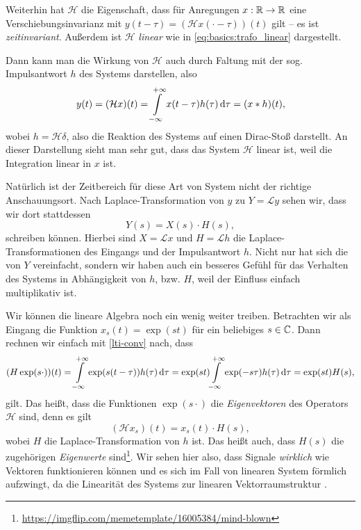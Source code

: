 Weiterhin hat $\mathcal{H}$ die Eigenschaft, dass 
für Anregungen $x : \mathbb{R} \rightarrow \mathbb{R}$ eine Verschiebungsinvarianz mit $y(t - \tau) = (\mathcal{H}x(\cdot  - \tau))(t)$ gilt -- es ist \emph{zeitinvariant}.
Außerdem ist $\mathcal{H}$ \emph{linear} wie in \eqref{eq:basics:trafo_linear} dargestellt.

Dann kann man die Wirkung von $\mathcal{H}$ auch durch Faltung mit der sog. Impulsantwort $h$ des Systems darstellen, also
%
\begin{equation}\label{lti-conv}
    y(t) 
        = (\mathcal{H}x)(t) 
        = {\int\limits_{-\infty}^{+\infty}{x(t - \tau) h(\tau)}\,\mathrm{d}{\tau}} 
        = (x \ast h)(t),
\end{equation}
%
wobei $h = \mathcal{H}\delta$, also die Reaktion des Systems auf einen Dirac-Stoß darstellt.
An dieser Darstellung sieht man sehr gut, dass das System $\mathcal{H}$ linear ist, weil die Integration linear in $x$ ist.

Natürlich ist der Zeitbereich für diese Art von System nicht der richtige Anschauungsort. 
Nach Laplace-Transformation von $y$ zu $Y = \mathcal{L}y$ sehen wir, dass wir dort stattdessen 
\[
Y(s) = X(s) \cdot H(s),
\]
schreiben können. 
Hierbei sind $X = \mathcal{L}x$ und $H = \mathcal{L}h$ die Laplace-Transformationen des Eingangs und der Impulsantwort $h$.
Nicht nur hat sich die  von $Y$ vereinfacht, sondern wir haben auch ein besseres Gefühl für das Verhalten des Systems in Abhängigkeit von $h$, bzw. $H$, weil der Einfluss einfach multiplikativ ist.

Wir können die lineare Algebra noch ein wenig weiter treiben. Betrachten wir als Eingang die Funktion $x_s(t) = \exp(s t)$ für ein beliebiges $s \in \mathbb{C}$.
Dann rechnen wir einfach mit \eqref{lti-conv} nach, dass
\[
(H\exp(s\cdot))(t) 
    = {\int\limits_{-\infty}^{+\infty}{\exp(s (t-\tau))h(\tau)}\,\mathrm{d}{\tau}}
    = \exp(s t) {\int\limits_{-\infty}^{+\infty}{\exp(-s\tau)h(\tau)}\,\mathrm{d}{\tau}}
    = \exp(s t) H(s),
\]
gilt. Das heißt, dass die Funktionen $\exp(s \cdot)$ die \emph{Eigenvektoren} des Operators $\mathcal{H}$ sind, denn es gilt 
\[
    (\mathcal{H} x_s)(t) = x_s(t) \cdot H(s),
\]
wobei $H$ die Laplace-Transformation von $h$ ist.
Das heißt auch, dass $H(s)$ die zugehörigen \emph{Eigenwerte} sind\footnote{\url{https://imgflip.com/memetemplate/16005384/mind-blown}}.
Wir sehen hier also, dass Signale \emph{wirklich} wie Vektoren funktionieren können und es sich im Fall von linearen System förmlich aufzwingt, da die Linearität des Systems zur linearen Vektorraumstruktur .
